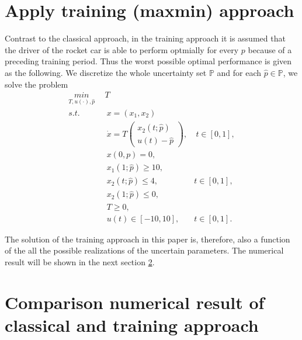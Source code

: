 \documentclass  [
  paper    = a4,
  BCOR     = 10mm,
  twoside,
  fontsize = 12pt,
  fleqn,
  toc      = bibnumbered,
  toc      = listofnumbered,
  numbers  = noendperiod,
  headings = normal,
  listof   = leveldown,
  version  = 3.03
]                                       {scrreprt}
\newcommand{\<}{\langle}
\renewcommand{\>}{\rangle}
\begin{document}

\section{Apply training (maxmin) approach}
Contrast to the classical approach, in the training approach it is assumed that the driver of the rocket car is able to perform optmially for every $p$ because of a preceding training period. Thus the worst possible optimal performance is given as the following. We discretize  the whole uncertainty set  $\mathbb{P}$ and for each $ \hat{p} \in \mathbb{P}$, we solve the problem 
\begin{subequations}
	\begin{align}
		\underset{T, u(\cdot), \hat{p}}{min} \   & \  T \\ 
		s.t.  & \ \ x = (x_1, x_2)   \label{ta_rc_x} \\ 
		& \ \  \dot{x} = T  \begin{pmatrix}  x_2(t;\hat{p}) \\ u(t)-\hat{p}   \end{pmatrix}, & \ t \in [0,1],  \label{ta_rc_partial} \\
		& \ \ x(0,p) = 0, \label{ta_rc_t0}\\
		& \ \ x_1(1;\hat{p}) \geq 10, \label{ta_rc_x1_t1} \\
		& \ \ x_2(t;\hat{p}) \leq 4, & t \in [0,1], \label{ta_rc_x2_tc} \\
		& \ \ x_2(1;\hat{p}) \leq 0, \label{ta_rc_x2_t1}  \\
		& \ \ T \geq 0, \\
		& \ \ u(t) \in [-10, 10], & t \in [0,1]. 
	\end{align}
	\label{TA_rc}
\end{subequations}



The solution of the training approach in this paper is, therefore, also a function of the all the possible realizations of the uncertain parameters. The numerical result will be shown in the next section \ref{Sec_NR}.



\section{Comparison numerical result of classical and training approach}
\label{Sec_NR}
\end{document}
